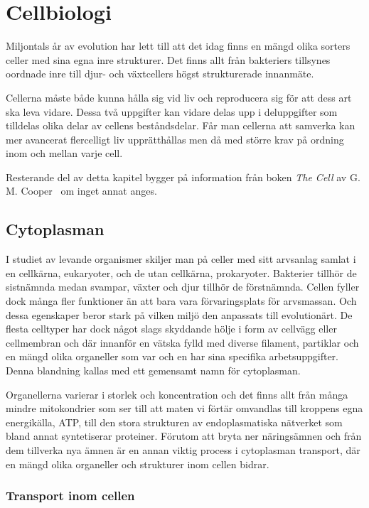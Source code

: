 \chapter{Cellbiologi}

Miljontals år av evolution har lett till att det idag finns en mängd olika sorters celler med sina egna inre strukturer. Det finns allt från bakteriers tillsynes oordnade inre till djur- och växtcellers högst strukturerade innanmäte. 

Cellerna måste både kunna hålla sig vid liv och reproducera sig för att dess art ska leva vidare. Dessa två uppgifter kan vidare delas upp i deluppgifter som tilldelas olika delar av cellens beståndsdelar. Får man cellerna att samverka kan mer avancerat flercelligt liv upprätthållas men då med större krav på ordning inom och mellan varje cell.

Resterande del av detta kapitel bygger på information från boken \textit{The Cell} av G. M.  Cooper~\cite{Cooper_TheCell2000} om inget annat anges.


\section{Cytoplasman}
I studiet av levande organismer skiljer man på celler med sitt arvsanlag samlat i en cellkärna, eukaryoter, och de utan cellkärna, prokaryoter. Bakterier tillhör de sistnämnda medan svampar, växter och djur tillhör de förstnämnda. Cellen fyller dock många fler funktioner än att bara vara förvaringsplats för arvsmassan. Och dessa egenskaper beror stark på vilken miljö den anpassats till evolutionärt. De flesta celltyper har dock något slags skyddande hölje i form av cellvägg eller cellmembran och där innanför en vätska fylld med diverse filament, partiklar och en mängd olika organeller som var och en har sina specifika arbetsuppgifter. Denna blandning kallas med ett gemensamt namn för cytoplasman. 

Organellerna varierar i storlek och koncentration och det finns allt från många mindre mitokondrier som ser till att maten vi förtär omvandlas till kroppens egna energikälla, ATP, till den stora strukturen av endoplasmatiska nätverket som bland annat syntetiserar proteiner. Förutom att bryta ner näringsämnen och från dem tillverka nya ämnen är en annan viktig process i cytoplasman transport, där en mängd olika organeller och strukturer inom cellen bidrar.


\subsection{Transport inom cellen}

